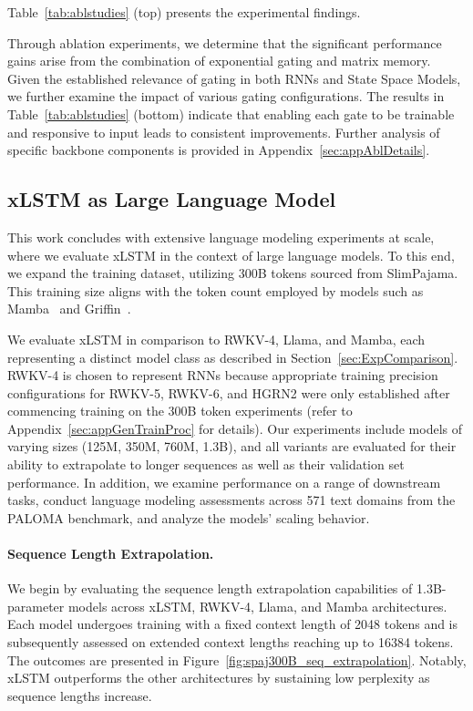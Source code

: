 Table~\ref{tab:ablstudies} (top) presents the experimental findings.

Through ablation experiments, we determine that the significant performance gains arise from the combination of exponential gating and matrix memory. Given the established relevance of gating in both RNNs and State Space Models, we further examine the impact of various gating configurations. The results in Table~\ref{tab:ablstudies} (bottom) indicate that enabling each gate to be trainable and responsive to input leads to consistent improvements. Further analysis of specific backbone components is provided in Appendix~\ref{sec:appAblDetails}.

\subsection{xLSTM as Large Language Model}
\label{sec:ExpLanguage}

This work concludes with extensive language modeling experiments at scale, where we evaluate xLSTM in the context of large language models. To this end, we expand the training dataset, utilizing 300B tokens sourced from SlimPajama. This training size aligns with the token count employed by models such as Mamba~\citep{Gu:24arxiv} and Griffin~\citep{De:24arxiv}.

We evaluate xLSTM in comparison to RWKV-4, Llama, and Mamba, each representing a distinct model class as described in Section~\ref{sec:ExpComparison}. RWKV-4 is chosen to represent RNNs because appropriate training precision configurations for RWKV-5, RWKV-6, and HGRN2 were only established after commencing training on the 300B token experiments (refer to Appendix~\ref{sec:appGenTrainProc} for details). Our experiments include models of varying sizes (125M, 350M, 760M, 1.3B), and all variants are evaluated for their ability to extrapolate to longer sequences as well as their validation set performance. In addition, we examine performance on a range of downstream tasks, conduct language modeling assessments across 571 text domains from the PALOMA benchmark, and analyze the models’ scaling behavior.

\paragraph{Sequence Length Extrapolation.}
\label{sec:spaj300B_ctx_extrapolation}
We begin by evaluating the sequence length extrapolation capabilities of 1.3B-parameter models across xLSTM, RWKV-4, Llama, and Mamba architectures. Each model undergoes training with a fixed context length of 2048 tokens and is subsequently assessed on extended context lengths reaching up to 16384 tokens. The outcomes are presented in Figure~\ref{fig:spaj300B_seq_extrapolation}. Notably, xLSTM outperforms the other architectures by sustaining low perplexity as sequence lengths increase.

